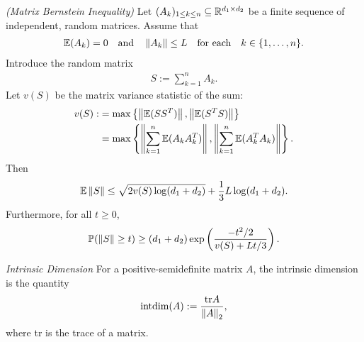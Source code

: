\begin{theorem}
  \emph{(Matrix Bernstein Inequality)}
  \label{rmineq_bernstein}
  Let $(A_k)_{1\le k \le n}\subseteq\mathbb{R}^{d_1\times d_2}$ be a finite sequence of independent, random matrices. Assume that
    \begin{gather}
      \label{rmineq_bernstein_cond_1}
      \mathbb{E}(A_k)=0\quad\text{and}\quad\left\lVert A_k\right\rVert\le L \quad \text{for each}\quad  k\in \{1,\ldots,n\}.
    \end{gather}
    Introduce the random matrix
      \begin{gather*}
        S:=\sum_{k=1}^n A_k.
      \end{gather*}
    Let $v(S)$ be the matrix variance statistic of the sum:
      \begin{align}
        \label{rmineq_bernstein_cond_2}
        \begin{split}
        v(S):&=\max\left\{ \left\lVert\mathbb{E}(SS^T)\right\rVert, \left\lVert\mathbb{E}(S^T S)\right\rVert \right\}\\
             &=\max\left\{ \left\lVert\sum_{k=1}^n\mathbb{E}(A_kA_k^T)\right\rVert, \left\lVert\sum_{k=1}^n\mathbb{E}(A_k^T A_k)\right\rVert \right\}.
        \end{split}
      \end{align}
    Then
      \begin{align}
        \label{rmineq_bernstein_expectation_bound}
        \mathbb{E}\left\lVert S\right\rVert\le \sqrt{2v(S)\log(d_1+d_2)} + \frac{1}{3}L\log(d_1+d_2).
      \end{align}
    Furthermore, for all $t\ge 0$,
      \begin{gather}
        \label{rmineq_bernstein_probability_bound}
        \mathbb{P}(\left\lVert S\right\rVert\ge t)\ge(d_1+d_2)\exp\left(\frac{-t^2/2}{v(S)+Lt/3} \right).
      \end{gather}
\end{theorem}
\begin{definition}
  \emph{Intrinsic Dimension}
  For a positive-semidefinite matrix $A$,
  the intrinsic dimension is the quantity
  \begin{gather*}
    \text{intdim}
    (A)
    :=
    \frac{\text{tr}A}{\left\lVert A\right\rVert_2}
    ,
  \end{gather*}
  where tr is the trace of a matrix.
\end{definition}
